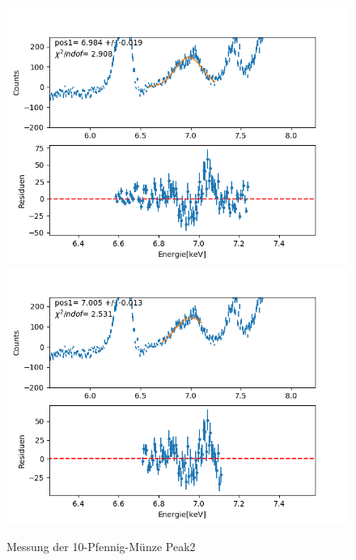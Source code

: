 \documentclass[12pt,a4paper]{article}
\begin{document}
\begin{figure}[H]
\centering
\includegraphics[scale=0.49]{Bilder/roentgen_spektren/pfennig/pfen2_1.png}
\includegraphics[scale=0.49]{Bilder/roentgen_spektren/pfennig/pfen2_2.png}
\caption{Messung der 10-Pfennig-Münze Peak2}
\end{figure}
\end{document}

